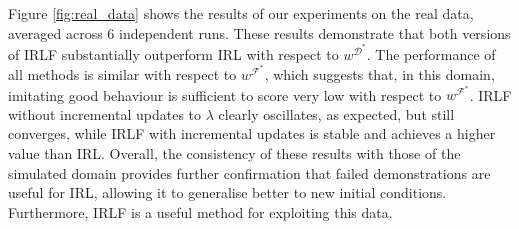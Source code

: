 \documentclass{aamas2016}
\begin{document}
Figure \ref{fig:real_data} shows the results of our experiments on the real data, averaged across 6 independent runs. These results demonstrate that both versions of IRLF substantially outperform IRL with respect to $w^{\mathcal{D}^*}$.  The performance of all methods is similar with respect to $w^{\mathcal{F}^*}$, which suggests that, in this domain, imitating good behaviour is sufficient to score very low with respect to $w^{\mathcal{F}^*}$.  IRLF without incremental updates to $\lambda$ clearly oscillates, as expected, but still converges, while IRLF with incremental updates is stable and achieves a higher value than IRL.
%
Overall, the consistency of these results with those of the simulated domain provides further confirmation that failed demonstrations are useful for IRL, allowing it to generalise better to new initial conditions.  Furthermore, IRLF is a useful method for exploiting this data.
\end{document}

